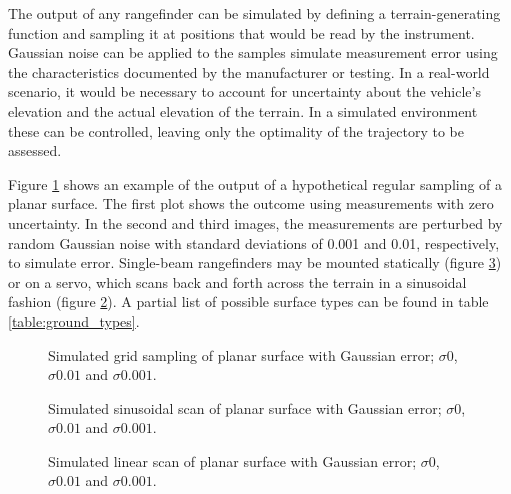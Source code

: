 \documentclass[10pt]{article}
\begin{document}
The output of any rangefinder can be simulated by defining a terrain-generating function and sampling it at positions that would be read by the instrument. Gaussian noise can be applied to the samples simulate measurement error using the characteristics documented by the manufacturer or testing. In a real-world scenario, it would be necessary to account for uncertainty about the vehicle's elevation and the actual elevation of the terrain. In a simulated environment these can be controlled, leaving only the optimality of the trajectory to be assessed.

Figure \ref{fig:point_plane} shows an example of the output of a hypothetical regular sampling of a planar surface. The first plot shows the outcome using measurements with zero uncertainty. In the second and third images, the measurements are perturbed by random Gaussian noise with standard deviations of 0.001 and 0.01, respectively, to simulate error. Single-beam rangefinders may be mounted statically (figure \ref{fig:linear_plane}) or on a servo, which scans back and forth across the terrain in a sinusoidal fashion (figure \ref{fig:sinus_plane}). A partial list of possible surface types can be found in table \ref{table:ground_types}.


\begin{figure}
\centering
\def\svgscale{0.25}

\def\svgscale{0.25}

\def\svgscale{0.25}

\caption{Simulated grid sampling of planar surface with Gaussian error; $\sigma 0$, $\sigma 0.01$ and $\sigma 0.001$.}
\label{fig:point_plane}
\end{figure}

\begin{figure}
\centering
\def\svgscale{0.25}

\def\svgscale{0.25}

\def\svgscale{0.25}

\caption{Simulated sinusoidal scan of planar surface with Gaussian error; $\sigma 0$, $\sigma 0.01$ and $\sigma 0.001$.}
\label{fig:sinus_plane}
\end{figure}

\begin{figure}
\centering
\def\svgscale{0.25}

\def\svgscale{0.25}

\def\svgscale{0.25}

\caption{Simulated linear scan of planar surface with Gaussian error; $\sigma 0$, $\sigma 0.01$ and $\sigma 0.001$.}
\label{fig:linear_plane}
\end{figure}
\end{document}
